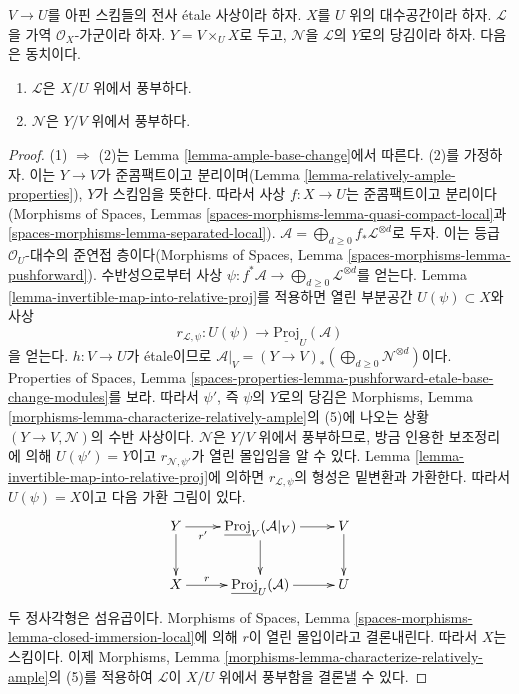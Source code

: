 \begin{lemma}
\label{lemma-descend-relatively-ample}
$V \to U$를 아핀 스킴들의 전사 \'etale 사상이라 하자.
$X$를 $U$ 위의 대수공간이라 하자.
$\mathcal{L}$을 가역 $\mathcal{O}_X$-가군이라 하자.
$Y = V \times_U X$로 두고, $\mathcal{N}$을 $\mathcal{L}$의 $Y$로의
당김이라 하자. 다음은 동치이다.
\begin{enumerate}
\item $\mathcal{L}$은 $X/U$ 위에서 풍부하다.
\item $\mathcal{N}$은 $Y/V$ 위에서 풍부하다.
\end{enumerate}
\end{lemma}

\begin{proof}
(1) $\Rightarrow$ (2)는 Lemma \ref{lemma-ample-base-change}에서 따른다.
(2)를 가정하자. 이는 $Y \to V$가 준콤팩트이고 분리이며(Lemma
\ref{lemma-relatively-ample-properties}), $Y$가 스킴임을 뜻한다.
따라서 사상 $f : X \to U$는 준콤팩트이고 분리이다(Morphisms of Spaces,
Lemmas \ref{spaces-morphisms-lemma-quasi-compact-local}과
\ref{spaces-morphisms-lemma-separated-local}).
$\mathcal{A} = \bigoplus_{d \geq 0} f_*\mathcal{L}^{\otimes d}$로 두자.
이는 등급 $\mathcal{O}_U$-대수의 준연접 층이다(Morphisms of Spaces,
Lemma \ref{spaces-morphisms-lemma-pushforward}). 수반성으로부터 사상
$\psi : f^*\mathcal{A} \to \bigoplus_{d \geq 0} \mathcal{L}^{\otimes d}$를
얻는다. Lemma \ref{lemma-invertible-map-into-relative-proj}를 적용하면
열린 부분공간 $U(\psi) \subset X$와 사상
$$
r_{\mathcal{L}, \psi} : U(\psi) \to \underline{\text{Proj}}_U(\mathcal{A})
$$
을 얻는다.
$h : V \to U$가 \'etale이므로
$\mathcal{A}|_V = (Y \to V)_*(\bigoplus_{d \geq 0} \mathcal{N}^{\otimes d})$이다.
Properties of Spaces, Lemma
\ref{spaces-properties-lemma-pushforward-etale-base-change-modules}를 보라.
따라서 $\psi'$, 즉 $\psi$의 $Y$로의 당김은 Morphisms, Lemma
\ref{morphisms-lemma-characterize-relatively-ample}의 (5)에 나오는 상황
$(Y \to V, \mathcal{N})$의 수반 사상이다. $\mathcal{N}$은 $Y/V$ 위에서
풍부하므로, 방금 인용한 보조정리에 의해 $U(\psi') = Y$이고
$r_{\mathcal{N}, \psi'}$가 열린 몰입임을 알 수 있다. Lemma
\ref{lemma-invertible-map-into-relative-proj}에 의하면
$r_{\mathcal{L}, \psi}$의 형성은 밑변환과 가환한다. 따라서
$U(\psi) = X$이고 다음 가환 그림이 있다.
$$
\xymatrix{
Y \ar[r]_-{r'} \ar[d] &
\underline{\text{Proj}}_V(\mathcal{A}|_V) \ar[d] \ar[r] &
V \ar[d] \\
X \ar[r]^-r &
\underline{\text{Proj}}_U(\mathcal{A}) \ar[r] &
U
}
$$
두 정사각형은 섬유곱이다. Morphisms of Spaces, Lemma
\ref{spaces-morphisms-lemma-closed-immersion-local}에 의해 $r$이 열린
몰입이라고 결론내린다. 따라서 $X$는 스킴이다. 이제 Morphisms, Lemma
\ref{morphisms-lemma-characterize-relatively-ample}의 (5)를 적용하여
$\mathcal{L}$이 $X/U$ 위에서 풍부함을 결론낼 수 있다.
\end{proof}

